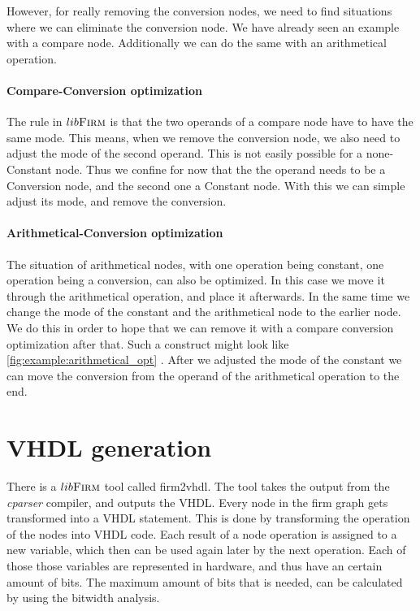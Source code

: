 However, for really removing the conversion nodes, we need to find situations where we can eliminate the conversion node. We have already seen an example with a compare node. Additionally we can do the same with an arithmetical operation.

\paragraph{Compare-Conversion optimization}
The rule in $lib\textsc{Firm}$ is that the two operands of a compare node have to have the same mode. This means, when we remove the conversion node, we also need to adjust the mode of the second operand. This is not easily possible for a none-Constant node.
Thus we confine for now that the the operand needs to be a Conversion node, and the second one a Constant node. With this we can simple adjust its mode, and remove the conversion.

\paragraph{Arithmetical-Conversion optimization}

The situation of arithmetical nodes, with one operation being constant, one operation  being a conversion, can also be optimized. In this case we move it through the arithmetical operation, and place it afterwards. In the same time we change the mode of the constant and the arithmetical node to the earlier node. We do this in order to hope that we can remove it with a compare conversion optimization after that.
Such a construct might look like \autoref{fig:example:arithmetical_opt} . After we adjusted the mode of the constant we can move the conversion from the operand of the arithmetical operation to the end.

\section{VHDL generation}

There is a $lib\textsc{Firm}$ tool called firm2vhdl. The tool takes the output from the \textit{cparser} compiler, and outputs the VHDL. Every node in the firm graph gets transformed into a VHDL statement. This is done by transforming the operation of the nodes into VHDL code. Each result of a node operation is assigned to a new variable, which then can be used again later by the next operation. 
Each of those those variables are represented in hardware, and thus have an certain amount of bits. The maximum amount of bits that is needed, can be calculated by using the bitwidth analysis.

